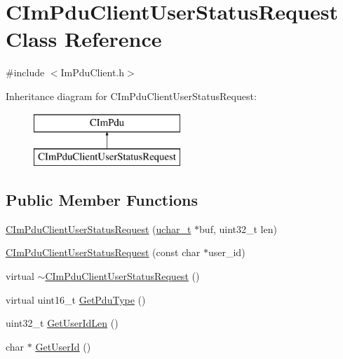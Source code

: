 \hypertarget{class_c_im_pdu_client_user_status_request}{}\section{C\+Im\+Pdu\+Client\+User\+Status\+Request Class Reference}
\label{class_c_im_pdu_client_user_status_request}


{\ttfamily \#include $<$Im\+Pdu\+Client.\+h$>$}

Inheritance diagram for C\+Im\+Pdu\+Client\+User\+Status\+Request\+:\begin{figure}[H]
\begin{center}
\leavevmode
\includegraphics[height=2.000000cm]{class_c_im_pdu_client_user_status_request}
\end{center}
\end{figure}
\subsection*{Public Member Functions}
\begin{DoxyCompactItemize}
\item 
\hyperlink{class_c_im_pdu_client_user_status_request_a948e3b50c9216bc7bb4861075eae68c4}{C\+Im\+Pdu\+Client\+User\+Status\+Request} (\hyperlink{base_2ostype_8h_a124ea0f8f4a23a0a286b5582137f0b8d}{uchar\+\_\+t} $\ast$buf, uint32\+\_\+t len)
\item 
\hyperlink{class_c_im_pdu_client_user_status_request_a28090659d4f8b353c61e279039eaa4d0}{C\+Im\+Pdu\+Client\+User\+Status\+Request} (const char $\ast$user\+\_\+id)
\item 
virtual \hyperlink{class_c_im_pdu_client_user_status_request_aa6609215a94a40a02385ea0da18c8990}{$\sim$\+C\+Im\+Pdu\+Client\+User\+Status\+Request} ()
\item 
virtual uint16\+\_\+t \hyperlink{class_c_im_pdu_client_user_status_request_a73f1e4dd48a449ba7dba1b70dea187b8}{Get\+Pdu\+Type} ()
\item 
uint32\+\_\+t \hyperlink{class_c_im_pdu_client_user_status_request_a2ea1c0fb6a425670f1945af61049491d}{Get\+User\+Id\+Len} ()
\item 
char $\ast$ \hyperlink{class_c_im_pdu_client_user_status_request_a3f66375493f871dc00c21e671266f931}{Get\+User\+Id} ()
\end{DoxyCompactItemize}
